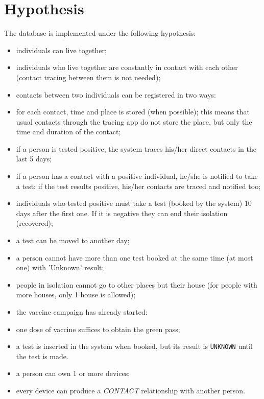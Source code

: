 \documentclass{article}
\begin{document}
\section{Hypothesis}
The database is implemented under the following hypothesis:
\begin{itemize}
\item individuals can live together;
\item individuals who live together are constantly in contact with each other (contact tracing between them is not needed);
\item contacts between two individuals can be registered in two ways:
\item for each contact, time and place is stored (when possible); this means that usual contacts through the tracing app do not store the place, but only the time and duration of the contact;
\item if a person is tested positive, the system traces his/her direct contacts in the last 5 days;
\item if a person has a contact with a positive individual, he/she is notified to take a test: if the test results positive, his/her contacts are traced and notified too;
\item individuals who tested positive must take a test (booked by the system) 10 days after the first one. If it is negative they can end their isolation (recovered);
\item a test can be moved to another day;
\item a person cannot have more than one test booked at the same time (at most one) with 'Unknown' result;
\item people in isolation cannot go to other places but their house (for people with more houses, only 1 house is allowed);
\item the vaccine campaign has already started:
\item one dose of vaccine suffices to obtain the green pass;
\item a test is inserted in the system when booked, but its result is \verb |UNKNOWN| until the test is made.
\item a person can own 1 or more devices;
\item every device can produce a \textit{CONTACT} relationship with another person.
\end{itemize}
\newpage
\end{document}
